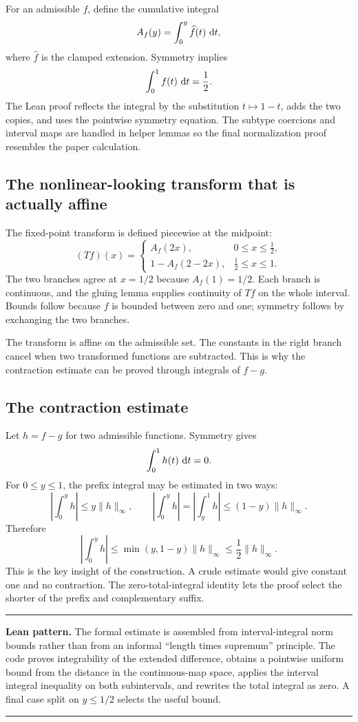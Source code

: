 \documentclass[11pt,oneside]{article}
\theoremstyle{definition}
\theoremstyle{remark}
\newcommand{\ClampedExtensionOf}[1]{\widehat{#1}}
\newenvironment{boxedremark}{%
  \par\smallskip\noindent\begin{center}\begin{minipage}{0.94\textwidth}%
  \color{black}\hrule\vspace{0.6em}\small
}{%
  \vspace{0.6em}\hrule\end{minipage}\end{center}\smallskip
}
\begin{document}
For an admissible \(f\), define the cumulative integral
\[
  A_f(y)=\int_0^y \ClampedExtensionOf{f}(t)\,\Differential t,
\]
where \(\ClampedExtensionOf{f}\) is the clamped extension.  Symmetry implies
\[
  \int_0^1 f(t)\,\mathop{}\!\mathrm{d} t=\frac12.
\]
The Lean proof reflects the integral by the substitution \(t\mapsto1-t\), adds the two copies, and uses the pointwise symmetry equation.  The subtype coercions and interval maps are handled in helper lemmas so the final normalization proof resembles the paper calculation.

\subsection{The nonlinear-looking transform that is actually affine}
The fixed-point transform is defined piecewise at the midpoint:
\[
  (Tf)(x)=
  \begin{cases}
    A_f(2x),&0\leq x\leq\tfrac12,\\[2mm]
    1-A_f(2-2x),&\tfrac12\leq x\leq1.
  \end{cases}
\]
The two branches agree at \(x=1/2\) because \(A_f(1)=1/2\).  Each branch is continuous, and the gluing lemma supplies continuity of \(Tf\) on the whole interval.  Bounds follow because \(f\) is bounded between zero and one; symmetry follows by exchanging the two branches.

The transform is affine on the admissible set.  The constants in the right branch cancel when two transformed functions are subtracted.  This is why the contraction estimate can be proved through integrals of \(f-g\).

\subsection{The contraction estimate}
Let \(h=f-g\) for two admissible functions.  Symmetry gives
\[
  \int_0^1 h(t)\,\mathop{}\!\mathrm{d} t=0.
\]
For \(0\leq y\leq1\), the prefix integral may be estimated in two ways:
\[
  \left|\int_0^y h\right|\leq y\lVert h\rVert_\infty,
  \qquad
  \left|\int_0^y h\right|
   =\left|\int_y^1 h\right|
   \leq(1-y)\lVert h\rVert_\infty.
\]
Therefore
\[
  \left|\int_0^y h\right|
  \leq \min(y,1-y)\lVert h\rVert_\infty
  \leq\frac12\lVert h\rVert_\infty.
\]
This is the key insight of the construction.  A crude estimate would give constant one and no contraction.  The zero-total-integral identity lets the proof select the shorter of the prefix and complementary suffix.

\begin{boxedremark}\textbf{Lean pattern.}\space
The formal estimate is assembled from interval-integral norm bounds rather than from an informal ``length times supremum'' principle.  The code proves integrability of the extended difference, obtains a pointwise uniform bound from the distance in the continuous-map space, applies the interval integral inequality on both subintervals, and rewrites the total integral as zero.  A final case split on \(y\leq1/2\) selects the useful bound.
\end{boxedremark}
\end{document}
